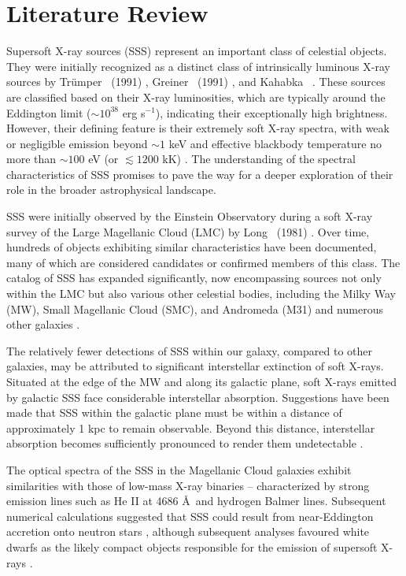     \newpage
    \section{Literature Review} \label{multi-obs:lit-rev}
    	Supersoft X-ray sources (SSS) represent an important class of celestial objects. They were initially recognized as a distinct class of intrinsically luminous X-ray sources by Trümper \etal\ (1991) \cite{trumper1991x}, Greiner \etal\ (1991) \cite{greiner1991rosat}, and Kahabka \etal\ \cite{kahabka97}. These sources are classified based on their X-ray luminosities, which are typically around the Eddington limit ($\sim 10^{38}$ erg s$^{-1}$), indicating their exceptionally high brightness. However, their defining feature is their extremely soft X-ray spectra, with weak or negligible emission beyond $\sim 1$ keV and effective blackbody temperature no more than $\sim 100$ eV (or $\lesssim 1200$ kK) \cite{kahabka06}. The understanding of the spectral characteristics of SSS promises to pave the way for a deeper exploration of their role in the broader astrophysical landscape.
    	
    	SSS were initially observed by the Einstein Observatory during a soft X-ray survey of the Large Magellanic Cloud (LMC) by Long \etal\ (1981) \cite{long81}. Over time, hundreds of objects exhibiting similar characteristics have been documented, many of which are considered candidates or confirmed members of this class. The catalog of SSS has expanded significantly, now encompassing sources not only within the LMC but also various other celestial bodies, including the Milky Way (MW), Small Magellanic Cloud (SMC), and Andromeda (M31) and numerous other galaxies \cite{kahabkatrumper1996,steinerdiaz1998,greiner2000,pietsch2003deep,di2003luminous,orio2010census,henze2010recent,sturm2012new,galiullin2021populations}.
    	
    	The relatively fewer detections of SSS within our galaxy, compared to other galaxies, may be attributed to significant interstellar extinction of soft X-rays. Situated at the edge of the MW and along its galactic plane, soft X-rays emitted by galactic SSS face considerable interstellar absorption. Suggestions have been made that SSS within the galactic plane must be within a distance of approximately 1 kpc to remain observable. Beyond this distance, interstellar absorption becomes sufficiently pronounced to render them undetectable \cite{van1992accreting}.
    	
    	The optical spectra of the SSS in the Magellanic Cloud galaxies exhibit similarities with those of low-mass X-ray binaries -- characterized by strong emission lines such as He II at 4686 \AA\ and hydrogen Balmer lines. Subsequent numerical calculations suggested that SSS could result from near-Eddington accretion onto neutron stars \cite{kylafis93}, although subsequent analyses favoured white dwarfs as the likely compact objects responsible for the emission of supersoft X-rays \cite{van1992accreting}.
    	
